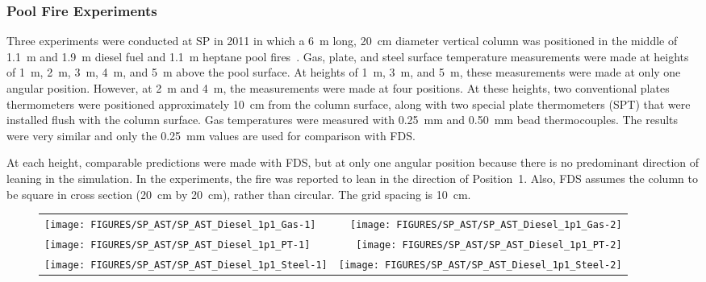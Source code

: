 \clearpage



\subsubsection{Pool Fire Experiments}

Three experiments were conducted at SP in 2011 in which a 6~m long, 20~cm diameter vertical column was positioned in the middle of 1.1~m and 1.9~m diesel fuel and 1.1~m heptane
pool fires~\cite{Sjostrom:AST}. Gas, plate, and steel surface temperature measurements were made at heights of 1~m, 2~m, 3~m, 4~m, and 5~m above the pool surface. At heights of 1~m, 3~m, and 5~m, these measurements were made at only one angular position. However, at 2~m and 4~m, the measurements were made at four positions. At these heights, two conventional plates thermometers were positioned approximately 10~cm from the column surface, along with two special plate thermometers (SPT) that were installed flush with the column surface. Gas temperatures were measured with 0.25~mm and 0.50~mm bead thermocouples. The results were very similar and only the 0.25~mm values are used for comparison with FDS.

At each height, comparable predictions were made with FDS, but at only one angular position because there is no predominant direction of leaning in the simulation. In the experiments, the fire was reported to lean in the direction of Position~1. Also, FDS assumes the column to be square in cross section (20~cm by 20~cm), rather than circular. The grid spacing is 10~cm.

\newpage

\begin{figure}[p]
\begin{tabular*}{\textwidth}{l@{\extracolsep{\fill}}r}
\texttt{[image: FIGURES/SP\_AST/SP\_AST\_Diesel\_1p1\_Gas-1]}   &  \texttt{[image: FIGURES/SP\_AST/SP\_AST\_Diesel\_1p1\_Gas-2]}    \\
\texttt{[image: FIGURES/SP\_AST/SP\_AST\_Diesel\_1p1\_PT-1]}    &  \texttt{[image: FIGURES/SP\_AST/SP\_AST\_Diesel\_1p1\_PT-2]}     \\
\texttt{[image: FIGURES/SP\_AST/SP\_AST\_Diesel\_1p1\_Steel-1]} &  \texttt{[image: FIGURES/SP\_AST/SP\_AST\_Diesel\_1p1\_Steel-2]}
\end{tabular*}
\label{SP_Diesel_1p1_1m}
\end{figure}

